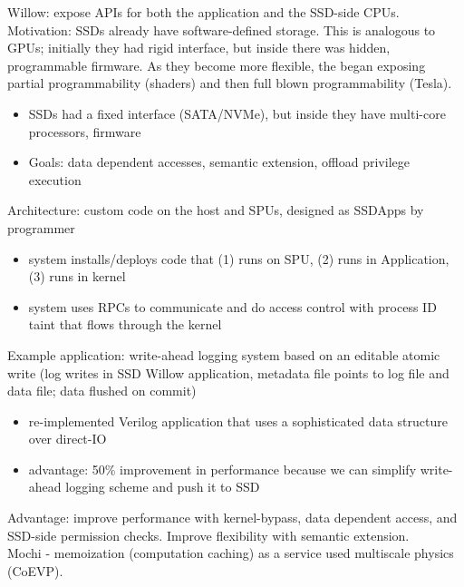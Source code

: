 \documentclass{article}
\begin{document}
\noindent\cite{seshadri:osdi2014-willow} Willow: expose APIs for both the application and the SSD-side CPUs.\\
Motivation: SSDs already have software-defined storage. This is analogous to GPUs; initially they had rigid interface, but inside there was hidden, programmable firmware. As they become more flexible, the began exposing partial programmability (shaders) and then full blown programmability (Tesla).
\begin{itemize}
	\item SSDs had a fixed interface (SATA/NVMe), but inside they have multi-core processors, firmware
	\item Goals: data dependent accesses, semantic extension, offload privilege execution
\end{itemize}
Architecture: custom code on the host and SPUs, designed as SSDApps by programmer
\begin{itemize}
	\item system installs/deploys code that (1) runs on SPU, (2) runs in Application, (3) runs in kernel
	\item system uses RPCs to communicate and do access control with process ID taint that flows through the kernel
\end{itemize}
Example application: write-ahead logging system based on an editable atomic write (log writes in SSD Willow application, metadata file points to log file and data file; data flushed on commit)
\begin{itemize}
	\item re-implemented Verilog application that uses a sophisticated data structure over direct-IO
	\item advantage: 50\% improvement in performance because we can simplify write-ahead logging scheme and push it to SSD
\end{itemize}
Advantage: improve performance with kernel-bypass, data dependent access, and SSD-side permission checks. Improve flexibility with semantic extension.\\

\noindent\cite{jenkins:ipdsw17-mochi} Mochi - memoization (computation caching) as a service used multiscale physics (CoEVP). 


	





\newpage
\onecolumn
\appendix
\end{document}
